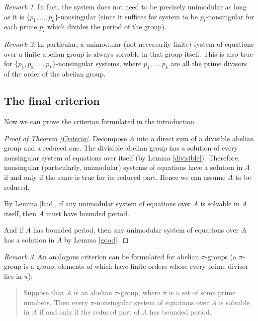 \documentclass{article}
\theoremstyle{definition}
\theoremstyle{remark}
\newtheorem*{rem}{Remark}
\begin{document}
\begin{rem}
In fact, the system does not need to be precisely unimodular
as long as it is $\{p_1,\ldots,p_k\}$-nonsingular
(since it suffices for system to be $p_i$-nonsingular
for each prime $p_i$ which divides the period of the group).
\end{rem}
\begin{rem}
In particular, a unimodular (not necessarily finite) system of equations
over a finite abelian group is always solvable in that group itself.
This is also true for $\{p_1,p_2,\ldots,p_k\}$-nonsingular systems,
where $p_1,\ldots,p_k$ are all the prime divisors of the order of the abelian group.
\end{rem}

\subsection{The final criterion}

Now we can prove the criterion formulated in the introduction.

\begin{proof}[Proof of Theorem \ref{Criteria}]
Decompose $A$ into a direct sum of a divisible abelian group
and a reduced one.
The divisible abelian group has a solution of every
nonsingular system of equations over itself (by Lemma \ref{divisible}).
Therefore, nonsingular (particularly, unimodular)
systems of equations have a solution in $A$
if and only if
the same is true for its reduced part.
Hence we can assume $A$ to be reduced.

By Lemma \ref{bad}, if any unimodular system of equations
over $A$ is solvable in $A$ itself, then $A$ must have bounded period.

And if $A$ has bounded period, then any unimodular system of equations over $A$
has a solution in $A$ by Lemma \ref{good}.
\end{proof}
\begin{rem}
An analogous criterion can be formulated for abelian $\pi$-groups
(a $\pi$-group is a group, elements of which have finite orders whose
every prime divisor lies in $\pi$):
\begin{quote}
Suppose that $A$ is an abelian $\pi$-group, where
$\pi$ is a set of some prime numbers.
Then every $\pi$-nonsingular system of equations over
$A$ is solvable in $A$
if and only if
the reduced part of
$A$ has bounded period.
\end{quote}
\end{rem}
\end{document}
